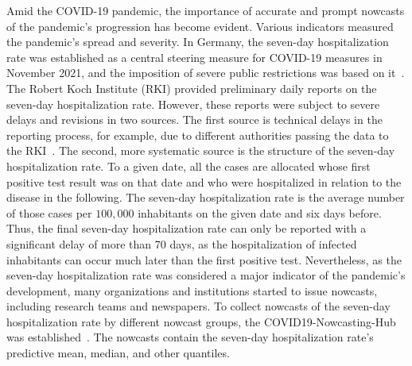 \documentclass[pdflatex]{sn-jnl}
\theoremstyle{plain}%
\theoremstyle{definition}
\begin{document}
Amid the COVID-19 pandemic, the importance of accurate and prompt nowcasts of the pandemic's progression has become evident.
Various indicators measured the pandemic's spread and severity.
In Germany, the seven-day hospitalization rate was established as a central steering measure for COVID-19 measures in November 2021, and the imposition of severe public restrictions was based on it~\citep{RobertKochInstitute2021}.
The Robert Koch Institute (RKI) provided preliminary daily reports on the seven-day hospitalization rate.
However, these reports were subject to severe delays and revisions in two sources.
The first source is technical delays in the reporting process, for example, due to different authorities passing the data to the RKI~\citep{RobertKochInstitute2024}.
The second, more systematic source is the structure of the seven-day hospitalization rate.
To a given date, all the cases are allocated whose first positive test result was on that date and who were hospitalized in relation to the disease in the following.
The seven-day hospitalization rate is the average number of those cases per $100,000$ inhabitants on the given date and six days before.
Thus, the final seven-day hospitalization rate can only be reported with a significant delay of more than 70 days, as the hospitalization of infected inhabitants can occur much later than the first positive test.
Nevertheless, as the seven-day hospitalization rate was considered a major indicator of the pandemic's development, many organizations and institutions started to issue nowcasts, including research teams and newspapers.
To collect nowcasts of the seven-day hospitalization rate by different nowcast groups, the COVID19-Nowcasting-Hub was established~\citep{ChairOfEconometricsAndStatisticsAtKarlsruheInstituteOfTechnology2024}.
The nowcasts contain the seven-day hospitalization rate's predictive mean, median, and other quantiles.
\end{document}
